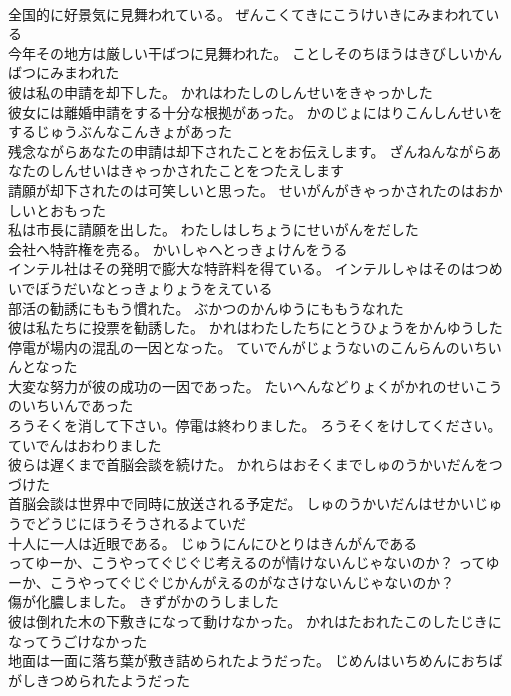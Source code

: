 \documentclass[8pt]{extreport}
\begin{document}
\begin{CJK}{UTF8}{min}
\\	全国的に好景気に見舞われている。	ぜんこくてきにこうけいきにみまわれている 
\\	今年その地方は厳しい干ばつに見舞われた。	ことしそのちほうはきびしいかんばつにみまわれた 
\\	彼は私の申請を却下した。	かれはわたしのしんせいをきゃっかした 
\\	彼女には離婚申請をする十分な根拠があった。	かのじょにはりこんしんせいをするじゅうぶんなこんきょがあった 
\\	残念ながらあなたの申請は却下されたことをお伝えします。	ざんねんながらあなたのしんせいはきゃっかされたことをつたえします 
\\	請願が却下されたのは可笑しいと思った。	せいがんがきゃっかされたのはおかしいとおもった 
\\	私は市長に請願を出した。	わたしはしちょうにせいがんをだした 
\\	会社へ特許権を売る。	かいしゃへとっきょけんをうる 
\\	インテル社はその発明で膨大な特許料を得ている。	インテルしゃはそのはつめいでぼうだいなとっきょりょうをえている 
\\	部活の勧誘にももう慣れた。	ぶかつのかんゆうにももうなれた 
\\	彼は私たちに投票を勧誘した。	かれはわたしたちにとうひょうをかんゆうした 
\\	停電が場内の混乱の一因となった。	ていでんがじょうないのこんらんのいちいんとなった 
\\	大変な努力が彼の成功の一因であった。	たいへんなどりょくがかれのせいこうのいちいんであった 
\\	ろうそくを消して下さい。停電は終わりました。	ろうそくをけしてください。ていでんはおわりました 
\\	彼らは遅くまで首脳会談を続けた。	かれらはおそくまでしゅのうかいだんをつづけた 
\\	首脳会談は世界中で同時に放送される予定だ。	しゅのうかいだんはせかいじゅうでどうじにほうそうされるよていだ 
\\	十人に一人は近眼である。	じゅうにんにひとりはきんがんである 
\\	ってゆーか、こうやってぐじぐじ考えるのが情けないんじゃないのか？	ってゆーか、こうやってぐじぐじかんがえるのがなさけないんじゃないのか？ 
\\	傷が化膿しました。	きずがかのうしました 
\\	彼は倒れた木の下敷きになって動けなかった。	かれはたおれたこのしたじきになってうごけなかった 
\\	地面は一面に落ち葉が敷き詰められたようだった。	じめんはいちめんにおちばがしきつめられたようだった 

\end{CJK}
\end{document}
